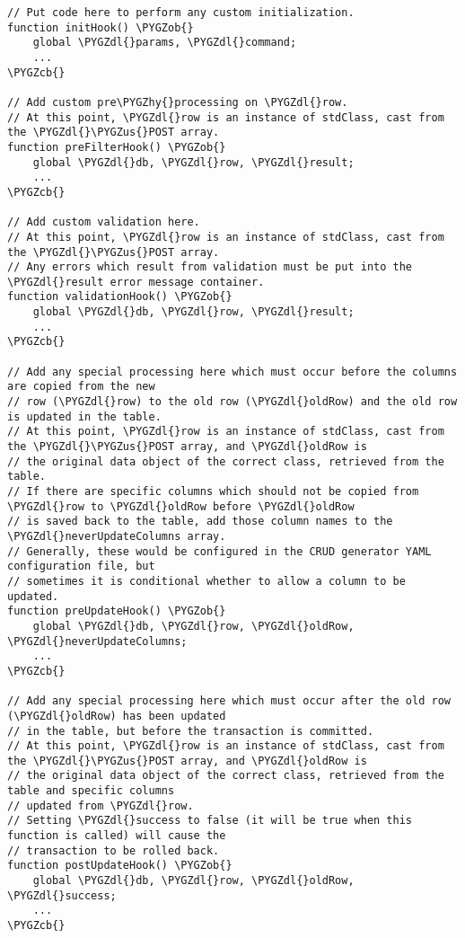 \documentclass[letterpaper,10pt,english]{sphinxmanual}
\def\PYGZus{\char`\_}
\def\PYGZob{\char`\{}
\def\PYGZcb{\char`\}}
\def\PYGZdl{\char`\$}
\def\PYGZhy{\char`\-}
\begin{document}
\begin{Verbatim}[commandchars=\\\{\}]
// Put code here to perform any custom initialization.
function initHook() \PYGZob{}
    global \PYGZdl{}params, \PYGZdl{}command;
    ...
\PYGZcb{}

// Add custom pre\PYGZhy{}processing on \PYGZdl{}row.
// At this point, \PYGZdl{}row is an instance of stdClass, cast from the \PYGZdl{}\PYGZus{}POST array.
function preFilterHook() \PYGZob{}
    global \PYGZdl{}db, \PYGZdl{}row, \PYGZdl{}result;
    ...
\PYGZcb{}

// Add custom validation here.
// At this point, \PYGZdl{}row is an instance of stdClass, cast from the \PYGZdl{}\PYGZus{}POST array.
// Any errors which result from validation must be put into the \PYGZdl{}result error message container.
function validationHook() \PYGZob{}
    global \PYGZdl{}db, \PYGZdl{}row, \PYGZdl{}result;
    ...
\PYGZcb{}

// Add any special processing here which must occur before the columns are copied from the new
// row (\PYGZdl{}row) to the old row (\PYGZdl{}oldRow) and the old row is updated in the table.
// At this point, \PYGZdl{}row is an instance of stdClass, cast from the \PYGZdl{}\PYGZus{}POST array, and \PYGZdl{}oldRow is
// the original data object of the correct class, retrieved from the table.
// If there are specific columns which should not be copied from \PYGZdl{}row to \PYGZdl{}oldRow before \PYGZdl{}oldRow
// is saved back to the table, add those column names to the \PYGZdl{}neverUpdateColumns array.
// Generally, these would be configured in the CRUD generator YAML configuration file, but
// sometimes it is conditional whether to allow a column to be updated.
function preUpdateHook() \PYGZob{}
    global \PYGZdl{}db, \PYGZdl{}row, \PYGZdl{}oldRow, \PYGZdl{}neverUpdateColumns;
    ...
\PYGZcb{}

// Add any special processing here which must occur after the old row (\PYGZdl{}oldRow) has been updated
// in the table, but before the transaction is committed.
// At this point, \PYGZdl{}row is an instance of stdClass, cast from the \PYGZdl{}\PYGZus{}POST array, and \PYGZdl{}oldRow is
// the original data object of the correct class, retrieved from the table and specific columns
// updated from \PYGZdl{}row.
// Setting \PYGZdl{}success to false (it will be true when this function is called) will cause the
// transaction to be rolled back.
function postUpdateHook() \PYGZob{}
    global \PYGZdl{}db, \PYGZdl{}row, \PYGZdl{}oldRow, \PYGZdl{}success;
    ...
\PYGZcb{}


\end{Verbatim}
\end{document}
